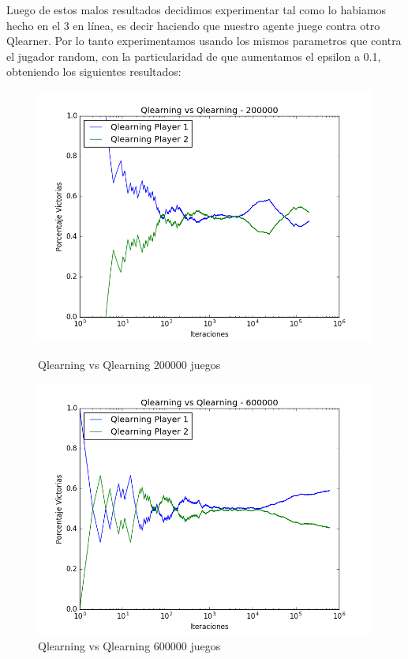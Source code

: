 Luego de estos malos resultados decidimos experimentar tal como lo habiamos hecho en el 3 en línea, es decir haciendo que nuestro agente juege contra otro Qlearner. Por lo tanto
experimentamos usando los mismos parametros que contra el jugador random, con la particularidad de que aumentamos el epsilon a 0.1, obteniendo los siguientes resultados:

\begin{figure}[H]
 \centering
 \begin{minipage}{.45\textwidth}
	\centering
	\includegraphics[scale=0.35]{resultados/7x6/QlearningVsQlearning_200000_7x6_parametros_informe.png}
       \caption{Qlearning vs Qlearning 200000 juegos}
  \end{minipage}
 \begin{minipage}{.5\textwidth}
	\centering
	\includegraphics[scale=0.35]{resultados/7x6/QlearningVsQlearning_600000_7x6_parametros_informe.png}
        \caption{Qlearning vs Qlearning 600000 juegos}
  \end{minipage}
\end{figure}

